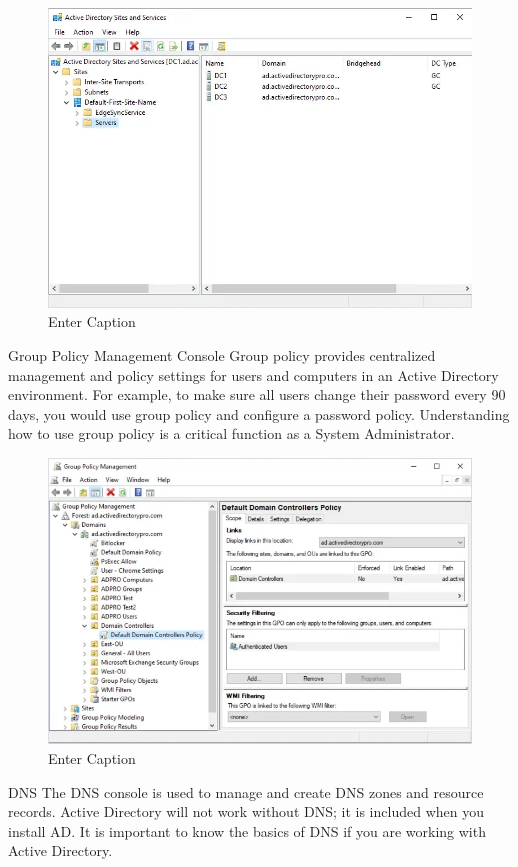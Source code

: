 \begin{figure}
    \centering
    \includegraphics[width=0.75\linewidth]{adss.png}
    \caption{Enter Caption}
    \label{fig:placeholder}
\end{figure}

Group Policy Management Console
Group policy provides centralized management and policy settings for users and computers in an Active Directory environment. For example, to make sure all users change their password every 90 days, you would use group policy and configure a password policy. Understanding how to use group policy is a critical function as a System Administrator. 

\begin{figure}
    \centering
    \includegraphics[width=0.75\linewidth]{gpm.png}
    \caption{Enter Caption}
    \label{fig:placeholder}
\end{figure}

DNS
The DNS console is used to manage and create DNS zones and resource records. Active Directory will not work without DNS; it is included when you install AD. It is important to know the basics of DNS if you are working with Active Directory.

